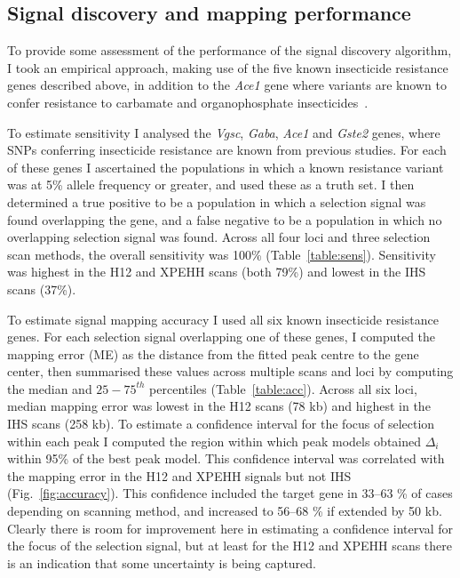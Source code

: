 \documentclass[a4paper,11pt,abstracton,hidelinks]{scrartcl}
\begin{document}
\subsection{Signal discovery and mapping performance}\label{subsec:performance}


To provide some assessment of the performance of the signal discovery algorithm, I took an empirical approach, making use of the five known insecticide resistance genes described above, in addition to the \textit{Ace1} gene where variants are known to confer resistance to carbamate and organophosphate insecticides~\parencite{Weill2003,Weill2004,Djogbenou2008}.


To estimate sensitivity I analysed the \textit{Vgsc}, \textit{Gaba}, \textit{Ace1} and \textit{Gste2} genes, where SNPs conferring insecticide resistance are known from previous studies.
%
For each of these genes I ascertained the populations in which a known resistance variant was at 5\% allele frequency or greater, and used these as a truth set.
%
I then determined a true positive to be a population in which a selection signal was found overlapping the gene, and a false negative to be a population in which no overlapping selection signal was found.
%
Across all four loci and three selection scan methods, the overall sensitivity was 100\% (Table~\ref{table:sens}).
%
Sensitivity was highest in the H12 and XPEHH scans (both 79\%) and lowest in the IHS scans (37\%).
%


To estimate signal mapping accuracy I used all six known insecticide resistance genes.
%
For each selection signal overlapping one of these genes, I computed the mapping error (ME) as the distance from the fitted peak centre to the gene center, then summarised these values across multiple scans and loci by computing the median and $25-75^{th}$ percentiles (Table~\ref{table:acc}).
%
Across all six loci, median mapping error was lowest in the H12 scans (78 kb) and highest in the IHS scans (258 kb).
%
To estimate a confidence interval for the focus of selection within each peak I computed the region within which peak models obtained $\Delta_i$ within 95\% of the best peak model.
%
This confidence interval was correlated with the mapping error in the H12 and XPEHH signals but not IHS (Fig.~\ref{fig:accuracy}).
%
This confidence included the target gene in 33--63 \% of cases depending on scanning method, and increased to 56--68 \% if extended by 50 kb.
%
Clearly there is room for improvement here in estimating a confidence interval for the focus of the selection signal, but at least for the H12 and XPEHH scans there is an indication that some uncertainty is being captured.
\end{document}
